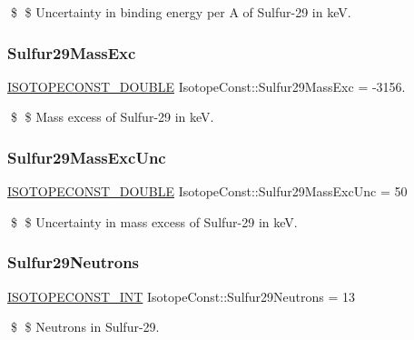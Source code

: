 \$ \$ Uncertainty in binding energy per A of Sulfur-\/29 in keV. \mbox{\label{group___isotope_const-_sulfur-_s29_ga114ae4b97b6d8b4f87635fde53054e72}} 
\subsubsection{\texorpdfstring{Sulfur29\+Mass\+Exc}{Sulfur29MassExc}}
{\footnotesize\ttfamily \mbox{\hyperlink{group___isotope_const-_macros_ga8f45a7272ce02c0b4c65c44636ed719a}{I\+S\+O\+T\+O\+P\+E\+C\+O\+N\+S\+T\+\_\+\+D\+O\+U\+B\+LE}} Isotope\+Const\+::\+Sulfur29\+Mass\+Exc = -\/3156.}

\$ \$ Mass excess of Sulfur-\/29 in keV. \mbox{\label{group___isotope_const-_sulfur-_s29_ga7ad037efc9da4d964c81a432a85d534c}} 
\subsubsection{\texorpdfstring{Sulfur29\+Mass\+Exc\+Unc}{Sulfur29MassExcUnc}}
{\footnotesize\ttfamily \mbox{\hyperlink{group___isotope_const-_macros_ga8f45a7272ce02c0b4c65c44636ed719a}{I\+S\+O\+T\+O\+P\+E\+C\+O\+N\+S\+T\+\_\+\+D\+O\+U\+B\+LE}} Isotope\+Const\+::\+Sulfur29\+Mass\+Exc\+Unc = 50}

\$ \$ Uncertainty in mass excess of Sulfur-\/29 in keV. \mbox{\label{group___isotope_const-_sulfur-_s29_ga50c6f14f00f163d9d4504c7d4836220d}} 
\subsubsection{\texorpdfstring{Sulfur29\+Neutrons}{Sulfur29Neutrons}}
{\footnotesize\ttfamily \mbox{\hyperlink{group___isotope_const-_macros_ga5f18360b3e99483a35c32d789e62621c}{I\+S\+O\+T\+O\+P\+E\+C\+O\+N\+S\+T\+\_\+\+I\+NT}} Isotope\+Const\+::\+Sulfur29\+Neutrons = 13}

\$ \$ Neutrons in Sulfur-\/29. \mbox{\label{group___isotope_const-_sulfur-_s29_gabb9d28135664a659949e7bc14ae9e775}} 
